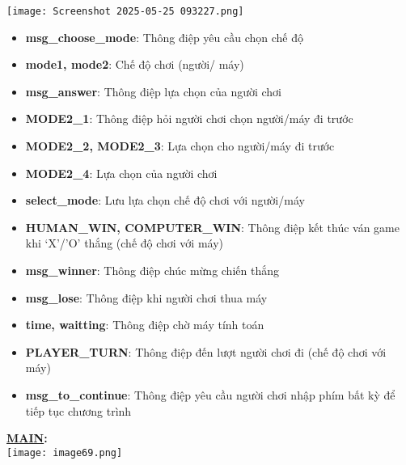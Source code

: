 \texttt{[image: Screenshot 2025-05-25 093227.png]}
\begin{itemize}
    \item \textbf{msg\_choose\_mode}: Thông điệp yêu cầu chọn chế độ
    \item \textbf{mode1, mode2}: Chế độ chơi (người/ máy)
    \item \textbf{msg\_answer}: Thông điệp lựa chọn của người chơi                        
    \item \textbf{MODE2\_1}: Thông điệp hỏi người chơi chọn người/máy đi trước                                
    \item \textbf{MODE2\_2, MODE2\_3}: Lựa chọn cho người/máy đi trước                                  
    \item \textbf{MODE2\_4}: Lựa chọn của người chơi
    \item \textbf{select\_mode}: Lưu lựa chọn chế độ chơi với người/máy
    \item \textbf{HUMAN\_WIN, COMPUTER\_WIN}: Thông điệp kết thúc ván game khi ‘X’/’O’ thắng (chế độ chơi với máy)
    \item \textbf{msg\_winner}: Thông điệp chúc mừng chiến thắng
    \item \textbf{msg\_lose}: Thông điệp khi người chơi thua máy
    \item \textbf{time, waitting}: Thông điệp chờ máy tính toán 
    \item \textbf{PLAYER\_TURN}: Thông điệp đến lượt người chơi đi (chế độ chơi với máy)   
    \item \textbf{msg\_to\_continue}: Thông điệp yêu cầu người chơi nhập phím bất kỳ để tiếp tục chương trình
\end{itemize}

\textbf{\underline{MAIN}:}\\
\texttt{[image: image69.png]}


